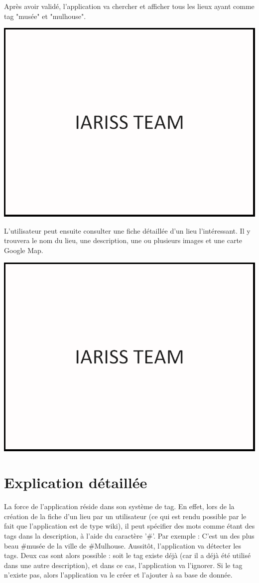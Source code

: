 \documentclass[12pt, a4paper]{article}
\newcommand{\espace}{\vspace{.8cm}}
\begin{document}
\espace{}
Après avoir validé, l'application va chercher et afficher tous les lieux ayant comme tag "musée" et "mulhouse".

\espace{}
\includegraphics[width=.9\textwidth, keepaspectratio=true]{img/test.png}

\espace{}
L'utilisateur peut ensuite consulter une fiche détaillée d'un lieu l'intéressant. Il y trouvera le nom du lieu, une description, une ou plusieurs images et une carte Google Map.

\espace{}
\includegraphics[width=.9\textwidth, keepaspectratio=true]{img/test.png}

\espace{}
\section{Explication détaillée}
La force de l'application réside dans son système de tag. En effet, lors de la création de la fiche d'un lieu par un utilisateur (ce qui est rendu possible par le fait que l'application est de type wiki), il peut spécifier des mots comme étant des tags dans la description, à l'aide du caractère '\#'. Par exemple : \og{}C'est un des plus beau \#musée de la ville de \#Mulhouse\fg{}. Aussitôt, l'application va détecter les tags. Deux cas sont alors possible : soit le tag existe déjà (car il a déjà été utilisé dans une autre description), et dans ce cas, l'application va l'ignorer. Si le tag n'existe pas, alors l'application va le créer et l'ajouter à sa base de donnée.
\end{document}
